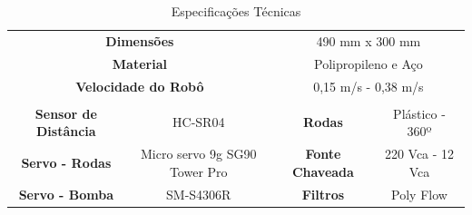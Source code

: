 \begin{table}[h]
\centering
\caption{Especificações Técnicas}
\label{spec-tec}
\begin{tabular}{@{}cccc@{}}
\toprule
\multicolumn{2}{c}{\textbf{Dimensões}}                                                                                                                                       & \multicolumn{2}{c}{490 mm x 300 mm}                                                                                                                                           \\
\multicolumn{2}{c}{\textbf{Material}}                                                                                                                                        & \multicolumn{2}{c}{Polipropileno e Aço}                                                                                                                                       \\
\multicolumn{2}{c}{\textbf{Velocidade do Robô}}                                                                                                                              & \multicolumn{2}{c}{0,15 m/s - 0,38 m/s}                                                                                                                                       \\ \midrule
\multicolumn{4}{c}{}                                                                                                                                                                                                                                                                                                                                         \\
\textbf{Sensor de Distância}   & HC-SR04                                                                                                                                     & \textbf{Rodas}          & Plástico - 360º                                                                                                                                     \\
\textbf{Servo - Rodas}         & Micro servo 9g SG90 Tower Pro                                                                                                               & \textbf{Fonte Chaveada} & 220 Vca - 12 Vca                                                                                                                                    \\
\textbf{Servo - Bomba}         & SM-S4306R                                                                                                                                   & \textbf{Filtros}        & Poly Flow                                                                                                                                           \\ \midrule

\end{tabular}
\end{table}
